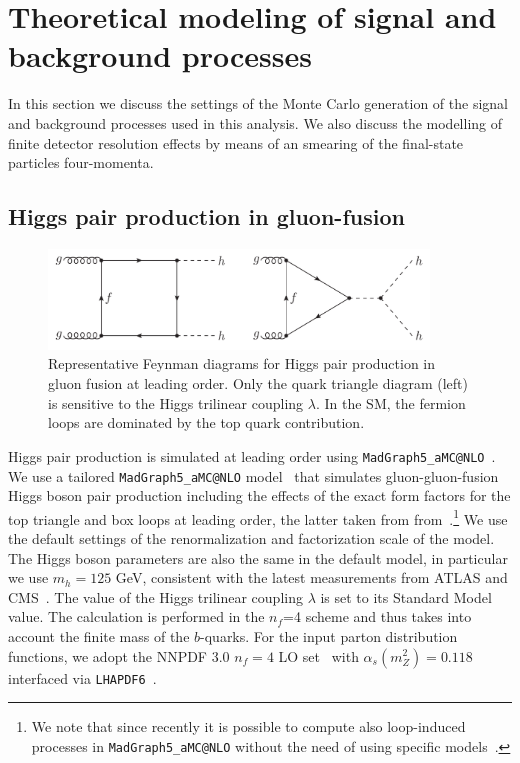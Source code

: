 

\section{Theoretical modeling of signal and background processes}
\label{mcgeneration}

In this section we discuss the settings of the
Monte Carlo generation of the signal and background
processes used in this analysis.
%
We also discuss the modelling of finite detector
resolution effects by means of an smearing of the final-state
particles four-momenta.

\subsection{Higgs pair production in gluon-fusion}


\begin{figure}[t]
\begin{center}
  \includegraphics[width=0.90\textwidth]{plots/hhFeyn.pdf}
  \caption{\small Representative Feynman diagrams
    for Higgs pair production in gluon fusion at
    leading order.
    Only the quark triangle diagram (left) is sensitive to the Higgs trilinear coupling
    $\lambda$.
    In the SM, the fermion loops are dominated by the top quark contribution.
}
\label{fig:hhFeyn}
\end{center}
\end{figure}

Higgs pair production is simulated at leading order using
{\tt MadGraph5\_aMC@NLO}~\cite{Alwall:2014hca}.
%
We use a tailored {\tt MadGraph5\_aMC@NLO} model~\cite{Maltoni:2014eza} that simulates
gluon-gluon-fusion Higgs boson pair production including the effects
of the
exact form factors for the top triangle and box loops at leading
order, the latter taken from from~\cite{Plehn:1996wb}.\footnote{We note that since recently it is possible to compute also
loop-induced processes in {\tt MadGraph5\_aMC@NLO} without the need of using specific
models~\cite{Hirschi:2015iia}.}
%
We use the default settings of the renormalization and factorization
scale of the model.
%
The Higgs boson parameters are also the same in the default model,
in particular we use $m_h=125$ GeV, consistent with the latest
measurements from ATLAS and CMS~\cite{Aad:2014aba,Khachatryan:2014jba}.
%
The value of the Higgs trilinear coupling $\lambda$ is set to its
Standard Model value.
%
The calculation is performed in the
$n_f$=4 scheme and thus
takes into account the finite mass of the $b$-quarks.
%
For the input parton distribution functions, we 
adopt the NNPDF 3.0 $n_f = 4$ LO set~\cite{Ball:2014uwa} with
$\alpha_s(m_Z^2)=0.118$
interfaced via {\tt LHAPDF6}~\cite{Buckley:2014ana}.

